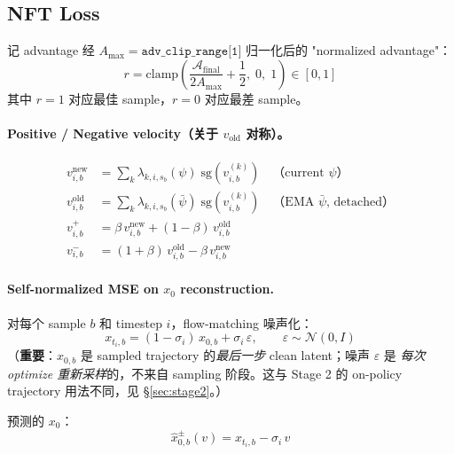 \documentclass[11pt,a4paper]{article}
\newcommand{\N}{\mathcal{N}}
\newcommand{\adv}{\mathcal{A}}
\newcommand{\sg}{\mathrm{sg}}
\theoremstyle{definition}
\begin{document}
\subsection{NFT Loss}
\label{subsec:nft_loss}

记 advantage 经 $A_{\max} = \texttt{adv\_clip\_range[1]}$ 归一化后的
"normalized advantage"：
\begin{equation}
r = \mathrm{clamp}\!\left(\frac{\adv_{\text{final}}}{2 A_{\max}} + \frac{1}{2},\;0,\;1\right) \in [0, 1]
\label{eq:r_def}
\end{equation}
其中 $r = 1$ 对应最佳 sample，$r = 0$ 对应最差 sample。

\paragraph{Positive / Negative velocity（关于 $v_{\text{old}}$ 对称）。}
\begin{align}
v_{i,b}^{\text{new}}  &= \sum_k \lambda_{k,i,s_b}(\psi)\;\sg(v^{(k)}_{i,b}) \quad\text{（current $\psi$）}
\label{eq:v_new}\\
v_{i,b}^{\text{old}}  &= \sum_k \lambda_{k,i,s_b}(\bar\psi)\;\sg(v^{(k)}_{i,b}) \quad\text{（EMA $\bar\psi$, detached）}
\label{eq:v_old}\\
v_{i,b}^{+}           &= \beta\,v_{i,b}^{\text{new}} + (1-\beta)\,v_{i,b}^{\text{old}}
\label{eq:v_plus}\\
v_{i,b}^{-}           &= (1+\beta)\,v_{i,b}^{\text{old}} - \beta\,v_{i,b}^{\text{new}}
\label{eq:v_minus}
\end{align}

\paragraph{Self-normalized MSE on $x_0$ reconstruction.}
对每个 sample $b$ 和 timestep $i$，flow-matching 噪声化：
\begin{equation}
x_{t_i, b} = (1 - \sigma_i)\,x_{0,b} + \sigma_i\,\varepsilon,
\qquad \varepsilon \sim \N(0, I)
\label{eq:flow_match_noise}
\end{equation}
（\textbf{重要}：$x_{0,b}$ 是 sampled trajectory 的\emph{最后一步} clean
latent；噪声 $\varepsilon$ 是 \emph{每次 optimize 重新采样}的，不来自
sampling 阶段。这与 Stage 2 的 on-policy trajectory 用法不同，见
\S\ref{sec:stage2}。）

预测的 $x_0$：
\begin{equation}
\hat{x}_{0,b}^{\pm}(v) = x_{t_i, b} - \sigma_i\,v
\label{eq:x0_pred}
\end{equation}
\end{document}
